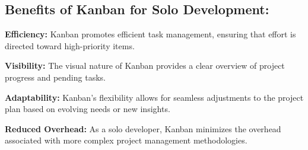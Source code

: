 \subsection{Benefits of Kanban for Solo Development:}

\begin{list}{}{\leftmargin=0em}
    \item \textbf{Efficiency:} Kanban promotes efficient task management, ensuring that effort is directed toward high-priority items.
    \item \textbf{Visibility:} The visual nature of Kanban provides a clear overview of project progress and pending tasks.
    \item \textbf{Adaptability:} Kanban's flexibility allows for seamless adjustments to the project plan based on evolving needs or new insights.
    \item \textbf{Reduced Overhead:} As a solo developer, Kanban minimizes the overhead associated with more complex project management methodologies.
\end{list}


